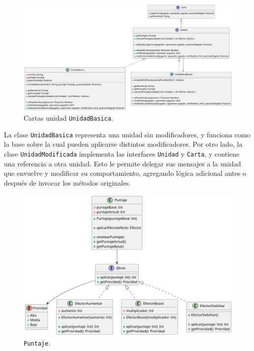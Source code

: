 \documentclass[titlepage,a4paper]{article}
\begin{document}
	\begin{figure}[H]
		\centering
		\includegraphics[width=1\textwidth]{diagramas/clases/UnidadBasica}
		\caption{\label{fig:class06}Cartas unidad \texttt{UnidadBasica}.}
	\end{figure}

	La clase \texttt{UnidadBasica} representa una unidad sin modificadores, y funciona como la base sobre la cual pueden aplicarse distintos modificadores.
	Por otro lado, la clase \texttt{UnidadModificada} implementa las interfaces \texttt{Unidad} y \texttt{Carta}, y contiene una referencia a otra unidad.
	Esto le permite delegar sus mensajes a la unidad que envuelve y modificar su comportamiento, agregando lógica adicional antes o después de invocar los métodos originales.

	\begin{figure}[H]
		\centering
		\includegraphics[width=1\textwidth]{diagramas/clases/Puntaje}
		\caption{\label{fig:class07}\texttt{Puntaje}.}
	\end{figure}
\end{document}

